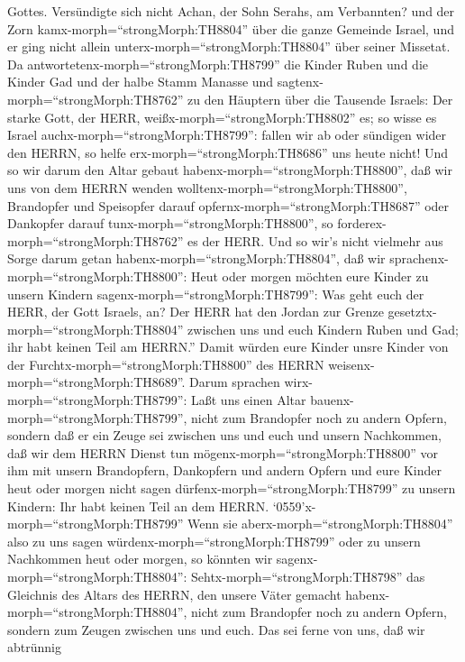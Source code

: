 Gottes.  Versündigte sich nicht Achan, der Sohn Serahs, am
Verbannten? und der Zorn kamx-morph=``strongMorph:TH8804'' über die
ganze Gemeinde Israel, und er ging nicht allein
unterx-morph=``strongMorph:TH8804'' über seiner Missetat. 
Da antwortetenx-morph=``strongMorph:TH8799'' die Kinder Ruben und die
Kinder Gad und der halbe Stamm Manasse und
sagtenx-morph=``strongMorph:TH8762'' zu den Häuptern über die Tausende
Israels:  Der starke Gott, der HERR,
weißx-morph=``strongMorph:TH8802'' es; so wisse es Israel
auchx-morph=``strongMorph:TH8799'': fallen wir ab oder sündigen wider
den HERRN, so helfe erx-morph=``strongMorph:TH8686'' uns heute nicht!
 Und so wir darum den Altar gebaut
habenx-morph=``strongMorph:TH8800'', daß wir uns von dem HERRN wenden
wolltenx-morph=``strongMorph:TH8800'', Brandopfer und Speisopfer darauf
opfernx-morph=``strongMorph:TH8687'' oder Dankopfer darauf
tunx-morph=``strongMorph:TH8800'', so
forderex-morph=``strongMorph:TH8762'' es der HERR.  Und so
wir's nicht vielmehr aus Sorge darum getan
habenx-morph=``strongMorph:TH8804'', daß wir
sprachenx-morph=``strongMorph:TH8800'': Heut oder morgen möchten eure
Kinder zu unsern Kindern sagenx-morph=``strongMorph:TH8799'': Was geht
euch der HERR, der Gott Israels, an?  Der HERR hat den
Jordan zur Grenze gesetztx-morph=``strongMorph:TH8804'' zwischen uns und
euch Kindern Ruben und Gad; ihr habt keinen Teil am HERRN.'' Damit
würden eure Kinder unsre Kinder von der
Furchtx-morph=``strongMorph:TH8800'' des HERRN
weisenx-morph=``strongMorph:TH8689''.  Darum sprachen
wirx-morph=``strongMorph:TH8799'': Laßt uns einen Altar
bauenx-morph=``strongMorph:TH8799'', nicht zum Brandopfer noch zu andern
Opfern,  sondern daß er ein Zeuge sei zwischen uns und euch
und unsern Nachkommen, daß wir dem HERRN Dienst tun
mögenx-morph=``strongMorph:TH8800'' vor ihm mit unsern Brandopfern,
Dankopfern und andern Opfern und eure Kinder heut oder morgen nicht
sagen dürfenx-morph=``strongMorph:TH8799'' zu unsern Kindern: Ihr habt
keinen Teil an dem HERRN. 
`0559'\textbar x-morph=``strongMorph:TH8799'' Wenn sie
aberx-morph=``strongMorph:TH8804'' also zu uns sagen
würdenx-morph=``strongMorph:TH8799'' oder zu unsern Nachkommen heut oder
morgen, so könnten wir sagenx-morph=``strongMorph:TH8804'':
Sehtx-morph=``strongMorph:TH8798'' das Gleichnis des Altars des HERRN,
den unsere Väter gemacht habenx-morph=``strongMorph:TH8804'', nicht zum
Brandopfer noch zu andern Opfern, sondern zum Zeugen zwischen uns und
euch.  Das sei ferne von uns, daß wir abtrünnig
